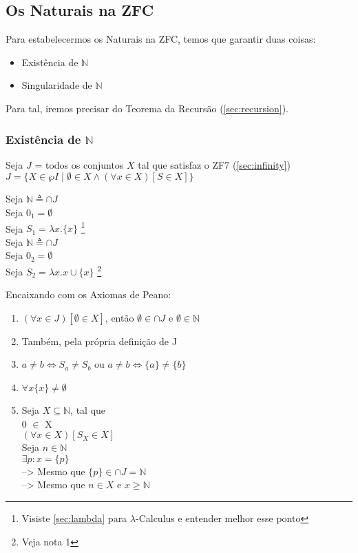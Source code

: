 \documentclass[12pt, a4paper]{article}
\begin{document}
\subsection{Os Naturais na ZFC}
Para estabelecermos os Naturais na ZFC, temos que garantir duas coisas:
\begin{itemize}
\item Existência de $\mathbb{N}$
\item Singularidade de $\mathbb{N}$
\end{itemize}

Para tal, iremos precisar do Teorema da Recursão (\ref{sec:recursion}).

\subsubsection{Existência de $\mathbb{N}$}
Seja $J$ = todos os conjuntos $X$ tal que satisfaz o ZF7 (\ref{sec:infinity})\\
$J = \{X \in \wp I \mid \emptyset \in X \land (\forall x \in X)[S \in X]\}$\\

\clearpage

\begin{multicols}{2}
\noindent Seja $\mathbb{N} \triangleq \cap J$\\
Seja $0_1 = \emptyset$\\
Seja $S_1 = \lambda x.\{x\}$ \footnote{Visiste \ref{sec:lambda} para $\lambda$-Calculus e entender melhor esse ponto}\\

\noindent Seja $\mathbb{N} \triangleq \cap J$\\
Seja $0_2 = \emptyset$\\
Seja $S_2 = \lambda x.x \cup \{x\} $ \footnote{Veja nota 1}
\end{multicols}

Encaixando com os Axiomas de Peano:
\begin{enumerate}
\item $(\forall x \in J)[\emptyset \in X]$, então $\emptyset \in \cap J$ e $\emptyset \in \mathbb{N}$
\item Também, pela própria definição de J
\item $a \neq b \iff S_a \neq S_b$ ou $a \neq b \iff \{a\} \neq \{b\}$
\item $\forall x \{x\} \neq \emptyset$
\item Seja $X \subseteq \mathbb{N}$, tal que\\
0 $\in$ X\\
$(\forall x \in X)[S_X \in X]$\\
Seja $n \in \mathbb{N}$\\
$\exists p : x = \{p\}$\\
--> Mesmo que $\{p\} \in \cap J = \mathbb{N}$\\
--> Mesmo que $n \in X$ e $x \geq \mathbb{N}$
\end{enumerate}
\end{document}
